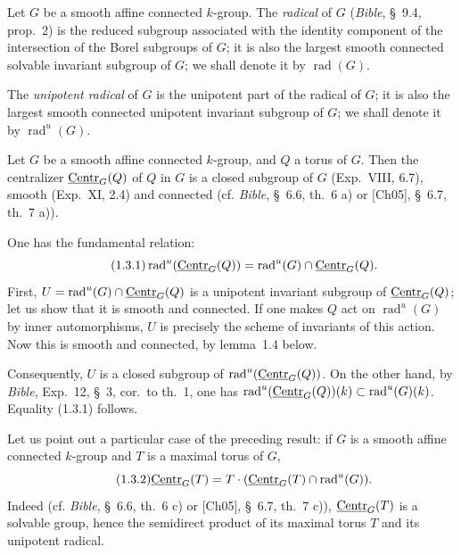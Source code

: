  Let $G$ be a smooth affine connected $k$-group. The \emph{radical} of $G$ (\textit{Bible}, \S~9.4, prop.~2){\renewcommand{\thefootnote}{(3)}} is the reduced subgroup associated with the identity component of the intersection of the Borel subgroups of $G$; it is also the largest smooth connected solvable invariant subgroup of $G$; we shall denote it by $\operatorname{rad}(G)$.

The \emph{unipotent radical} of $G$ is the unipotent part of the radical of $G$; it is also the largest smooth connected unipotent invariant subgroup of $G$; we shall denote it by $\operatorname{rad}^{u}(G)$.

 Let $G$ be a smooth affine connected $k$-group, and $Q$ a torus of $G$. Then the centralizer $\underline{\mathrm{Centr}}_G(Q)$ of $Q$ in $G$ is a closed subgroup of $G$ (Exp.~VIII, 6.7), smooth (Exp.~XI, 2.4) and connected (cf. \textit{Bible}, \S~6.6, th.~6 a) or [Ch05], \S~6.7, th.~7 a)).

One has the fundamental relation:
\begin{equation}\tag{1.3.1}\label{XIX.eq.1.3.1}
\operatorname{rad}^{u}(\underline{\mathrm{Centr}}_G(Q))=\operatorname{rad}^{u}(G)\cap\underline{\mathrm{Centr}}_G(Q).
\end{equation}
{\renewcommand{\thefootnote}{(4)}}%
First, $U=\operatorname{rad}^{u}(G)\cap\underline{\mathrm{Centr}}_G(Q)$ is a unipotent invariant subgroup of $\underline{\mathrm{Centr}}_G(Q)$; let us show that it is smooth and connected. If one makes $Q$ act on $\operatorname{rad}^{u}(G)$ by inner automorphisms, $U$ is precisely the scheme of invariants of this action. Now this is smooth and connected, by lemma~1.4 below.

Consequently, $U$ is a closed subgroup of $\operatorname{rad}^{u}(\underline{\mathrm{Centr}}_G(Q))$. On the other hand, by \textit{Bible}, Exp.~12, \S~3, cor.~to th.~1, one has $\operatorname{rad}^{u}(\underline{\mathrm{Centr}}_G(Q))(k)\subset\operatorname{rad}^{u}(G)(k)$. Equality (1.3.1) follows.

Let us point out a particular case of the preceding result: if $G$ is a smooth affine connected $k$-group and $T$ is a maximal torus of $G$,
\begin{equation}\tag{1.3.2}\label{XIX.eq.1.3.2}
\underline{\mathrm{Centr}}_G(T)=T\cdot(\underline{\mathrm{Centr}}_G(T)\cap\operatorname{rad}^{u}(G)).
\end{equation}
Indeed (cf. \textit{Bible}, \S~6.6, th.~6 c) or [Ch05], \S~6.7, th.~7 c)), $\underline{\mathrm{Centr}}_G(T)$ is a solvable group, hence the semidirect product of its maximal torus $T$ and its unipotent radical.

